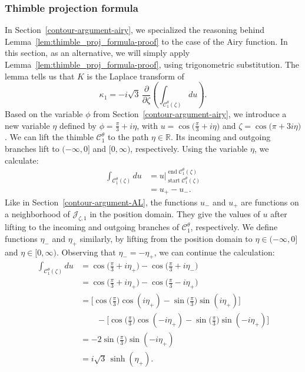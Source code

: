 \documentclass{article}
\newcommand{\R}{\mathbb{R}}
\theoremstyle{definition}
\theoremstyle{plain}
\begin{document}
\subsubsection{Thimble projection formula}\label{thimble-proj-airy}
%
In Section~\ref{contour-argument-airy}, we specialized the reasoning behind Lemma~\ref{lem:thimble_proj_formula-proof} to the case of the Airy function. In this section, as an alternative, we will simply apply Lemma~\ref{lem:thimble_proj_formula-proof}, using trigonometric substitution. The lemma tells us that $K$ is the Laplace transform of
\[ \kappa_1 = -i\sqrt{3}\,\frac{\partial}{\partial \zeta}\left(\int_{\mathcal{C}_1^\theta(\zeta)} du\right). \]
Based on the variable $\phi$ from Section~\ref{contour-argument-airy}, we introduce a new variable $\eta$ defined by $\phi = \tfrac{\pi}{3} + i\eta$, with $u = \cos\big(\tfrac{\pi}{3} + i\eta\big)$ and $\zeta = \cos\big(\pi + 3i\eta\big)$. We can lift the thimble $\mathcal{C}^\theta_1$ to the path $\eta \in \R$. Its incoming and outgoing branches lift to $(-\infty, 0]$ and $[0, \infty)$, respectively. Using the variable $\eta$, we calculate:
\begin{align*}
\int_{\mathcal{C}_1^\theta(\zeta)} du & = u \Big|_{\operatorname{start} \mathcal{C}^\theta_1(\zeta)}^{\operatorname{end} \mathcal{C}^\theta_1(\zeta)} \\
& = u_+ - u_-.
\end{align*}
Like in Section~\ref{contour-argument-AL}, the functions $u_-$ and $u_+$ are functions on a neighborhood of $\mathcal{J}_{\zeta, 1}$ in the position domain. They give the values of $u$ after lifting to the incoming and outgoing branches of $\mathcal{C}^\theta_1$, respectively. We define functions $\eta_-$ and $\eta_+$ similarly, by lifting from the position domain to $\eta \in (-\infty, 0]$ and $\eta \in [0, \infty)$. Observing that $\eta_- = -\eta_+$, we can continue the calculation:
\begin{align*}
\int_{\mathcal{C}_1^\theta(\zeta)} du & = \cos\big(\tfrac{\pi}{3} + i\eta_+\big) - \cos\big(\tfrac{\pi}{3} + i\eta_-\big) \\
& = \cos\big(\tfrac{\pi}{3} + i\eta_+\big) - \cos\big(\tfrac{\pi}{3} - i\eta_+\big) \\
& = \big[\cos\big(\tfrac{\pi}{3}\big) \cos(i\eta_+) - \sin\big(\tfrac{\pi}{3}\big) \sin(i\eta_+)\big] \\
& \qquad - \big[\cos\big(\tfrac{\pi}{3}\big) \cos(-i\eta_+) - \sin\big(\tfrac{\pi}{3}\big) \sin(-i\eta_+)\big] \\
& = -2 \sin\big(\tfrac{\pi}{3}\big) \sin(-i\eta_+) \\
& = i\sqrt{3}\,\sinh(\eta_+).
\end{align*}
\end{document}
